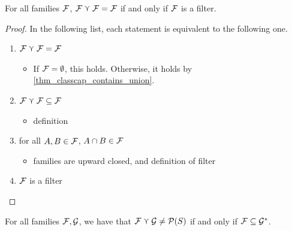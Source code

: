 \begin{theorem}
    \label{thm_classcap_idempotent_at_filters}
    For all families $\mathcal{F}$, $\mathcal{F} \curlyvee \mathcal{F} = \mathcal{F}$ if and only if $\mathcal{F}$ is a filter.
\end{theorem}

\begin{proof}
     In the following list, each statement is equivalent to the following one.
    \begin{enumerate}
        \item $\mathcal{F} \curlyvee \mathcal{F} = \mathcal{F}$
        \begin{itemize}
            \item[--] If $\mathcal{F} = \emptyset$, this holds.  Otherwise, it holds by \cref{thm_classcap_contains_union}.
        \end{itemize}
        \item $\mathcal{F} \curlyvee \mathcal{F} \subseteq \mathcal{F}$
        \begin{itemize}
            \item[--] definition
        \end{itemize}
        \item for all $A, B \in \mathcal{F}$, $A \cap B \in \mathcal{F}$
        \begin{itemize}
            \item[--] families are upward closed, and definition of filter
        \end{itemize}
        \item $\mathcal{F}$ is a filter
    \end{enumerate}
\end{proof}

\begin{theorem}
    \label{thm_classcap_full_condition}
     For all families $\mathcal{F}, \mathcal{G}$, we have that $\mathcal{F} \curlyvee \mathcal{G} \neq \mathcal{P}(S)$ if and only if $\mathcal{F} \subseteq \mathcal{G}^*$.
\end{theorem}


